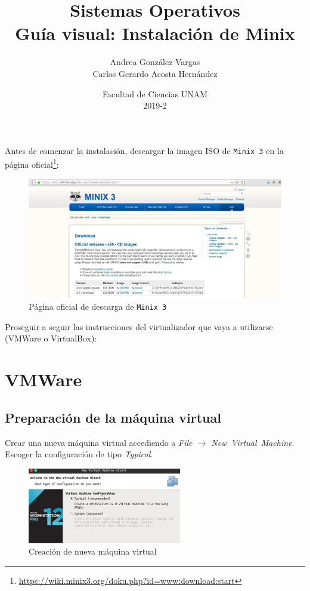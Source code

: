 \documentclass[12pt]{article}
\title{Sistemas Operativos\\ Guía visual: Instalación de Minix}
\author{Andrea González Vargas\\Carlos Gerardo Acosta Hernández}
\date{Facultad de Ciencias UNAM \\ 2019-2}
\begin{document}
\maketitle

Antes de comenzar la instalación, descargar la imagen ISO de \texttt{Minix 3} en la página oficial\footnote{\url{https://wiki.minix3.org/doku.php?id=www:download:start}}:
\begin{figure}[H]
  \centering
  \includegraphics[width=\textwidth]{vm/min00.png}
  \caption{Página oficial de descarga de \texttt{Minix 3}}
\end{figure}

Proseguir a seguir las instrucciones del virtualizador que vaya a utilizarse (VMWare o VirtualBox):

\section{VMWare}

\subsection*{Preparación de la máquina virtual}

Crear una nueva máquina virtual accediendo a \textit{File $\rightarrow$ New\ Virtual\ Machine}.\\

Escoger la configuración de tipo \textit{Typical}.
\begin{figure}[H]
  \centering
  \includegraphics[width=0.6\textwidth]{vm/min01.png}
  \caption{Creación de nueva máquina virtual}
\end{figure}
\end{document}
